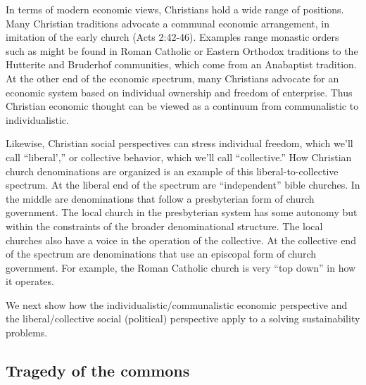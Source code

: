 \documentclass[12pt]{article}
\begin{document}
In terms of modern economic views, Christians hold a wide range of positions. Many Christian traditions advocate a communal
economic arrangement, in imitation of the early church (Acts 2:42-46). Examples range monastic orders such as might be found
in Roman Catholic or Eastern Orthodox traditions to the Hutterite and Bruderhof communities, which come from an Anabaptist tradition.
At the other end of the economic spectrum, many Christians advocate for an economic system based on individual ownership
and freedom of enterprise. Thus Christian economic thought can be viewed as a continuum from communalistic to individualistic.

Likewise, Christian social perspectives can stress individual freedom, which we'll call ``liberal','' or collective behavior, which
we'll call ``collective.'' How Christian church denominations are organized is an example of this liberal-to-collective spectrum.
At the liberal end of the spectrum are ``independent'' bible churches. In the middle are denominations that follow a presbyterian form of church 
government. The local church in the presbyterian system has some autonomy but within the constraints of the broader 
denominational structure. The local churches also have a voice in the operation of the collective. At the collective end of the spectrum 
are denominations that use an episcopal form of church government. For example, the Roman Catholic church is very ``top down'' 
in how it operates.

We next show how the individualistic/communalistic economic perspective and the liberal/collective social (political) perspective
apply to a solving sustainability problems.

\subsection{Tragedy of the commons}
\label{sec:totc}
\end{document}
